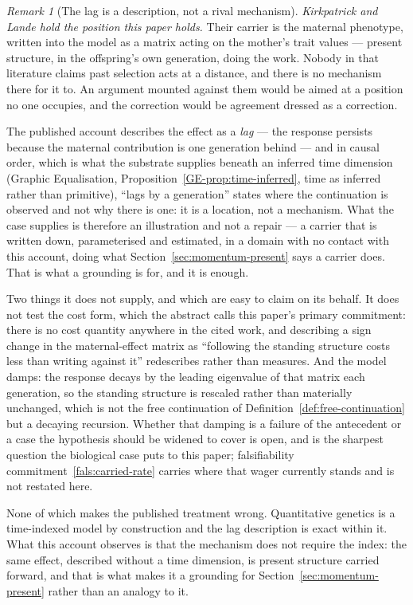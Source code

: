 \documentclass[11pt,a4paper]{article}
\theoremstyle{remark}
\newtheorem{remark}[definition]{Remark}
\begin{document}
\begin{remark}[The lag is a description, not a rival mechanism]\label{rem:evo-tests}
\emph{Kirkpatrick and Lande hold the position this paper holds.} Their carrier is the maternal
phenotype, written into the model as a matrix acting on the mother's trait values --- present
structure, in the offspring's own generation, doing the work. Nobody in that literature claims past
selection acts at a distance, and there is no mechanism there for it to. An argument mounted against
them would be aimed at a position no one occupies, and the correction would be agreement dressed as a
correction.

The published account describes the effect as a \emph{lag} --- the response persists because the
maternal contribution is one generation behind --- and in causal order, which is what the substrate
supplies beneath an inferred time dimension (Graphic Equalisation,
Proposition~\ref{GE-prop:time-inferred}, time as inferred rather than primitive), ``lags by a
generation'' states where the continuation is observed and not why there is one: it is a location,
not a mechanism. What the case supplies is therefore an illustration and not a repair --- a carrier
that is written down, parameterised and estimated, in a domain with no contact with this account,
doing what Section~\ref{sec:momentum-present} says a carrier does. That is what a grounding is for,
and it is enough.

Two things it does not supply, and which are easy to claim on its behalf. It does not test the cost form,
which the abstract calls this paper's primary commitment: there is no cost quantity anywhere in the
cited work, and describing a sign change in the maternal-effect matrix as ``following the standing
structure costs less than writing against it'' redescribes rather than measures. And the model damps:
the response decays by the leading eigenvalue of that matrix each generation, so the standing
structure is rescaled rather than materially unchanged, which is not the free continuation of
Definition~\ref{def:free-continuation} but a decaying recursion. Whether that damping is a failure
of the antecedent or a case the hypothesis should be widened to cover is open, and is the sharpest
question the biological case puts to this paper; falsifiability
commitment~\ref{fals:carried-rate} carries where that wager currently stands and is not restated
here.

None of which makes the published treatment wrong. Quantitative genetics is a time-indexed model by
construction and the lag description is exact within it. What this account observes is that the
mechanism does not require the index: the same effect, described without a time dimension, is present
structure carried forward, and that is what makes it a grounding for
Section~\ref{sec:momentum-present} rather than an analogy to it.
\end{remark}
\end{document}
